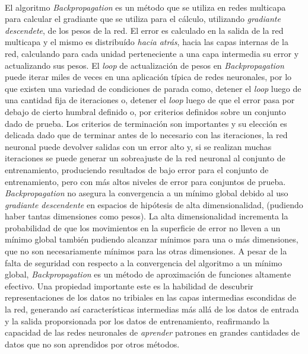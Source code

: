 \paragraph{}El algoritmo \textit{Backpropagation} es un método que se utiliza en redes multicapa para calcular el gradiante que se utiliza para el cálculo, utilizando \textit{gradiante descendete}, de los pesos de la red. El error es calculado en la salida de la red multicapa y el mismo es distribuído \textit{hacia atrás}, hacia las capas internas de la red, calculando para cada unidad perteneciente a una capa intermedia su error y actualizando sus pesos. El \textit{loop} de actualización de pesos en \textit{Backpropagation} puede iterar miles de veces en una aplicación típica de redes neuronales, por lo que existen una variedad de condiciones de parada como, detener el \textit{loop} luego de una cantidad fija de iteraciones o, detener el \textit{loop} luego de que el error pasa por debajo de cierto humbral definido o, por criterios definidos sobre un conjunto dado de prueba. Los criterios de terminación son importantes y su elección es delicada dado que de terminar antes de lo necesario con las iteraciones, la red neuronal puede devolver salidas con un error alto y, si se realizan muchas iteraciones se puede generar un sobreajuste de la red neuronal al conjunto de entrenamiento, produciendo resultados de bajo error para el conjunto de entrenamiento, pero con más altos niveles de error para conjuntos de prueba. \textit{Backpropagation} no asegura la convergencia a un mínimo global debido al uso \textit{gradiante descendente} en espacios de hipótesis de alta dimensionalidad, (pudiendo haber tantas dimensiones como pesos). La alta dimensionalidad incrementa la probabilidad de que los movimientos en la superficie de error no lleven a un mínimo global también pudiendo alcanzar mínimos para una o más dimensiones, que no son necesariamente mínimos para las otras dimensiones. A pesar de la falta de seguridad con respecto a la convergencia del algoritmo a un mínimo global, \textit{Backpropagation} es un método de aproximación de funciones altamente efectivo. Una propiedad importante este es la habilidad de descubrir representaciones de los datos no tribiales en las capas intermedias escondidas de la red, generando así características intermedias más allá de los datos de entrada y la salida proporsionada por los datos de entrenamiento, reafirmando la capacidad de las redes neuronales de \textit{aprender} patrones en grandes cantidades de datos que no son aprendidos por otros métodos. 


